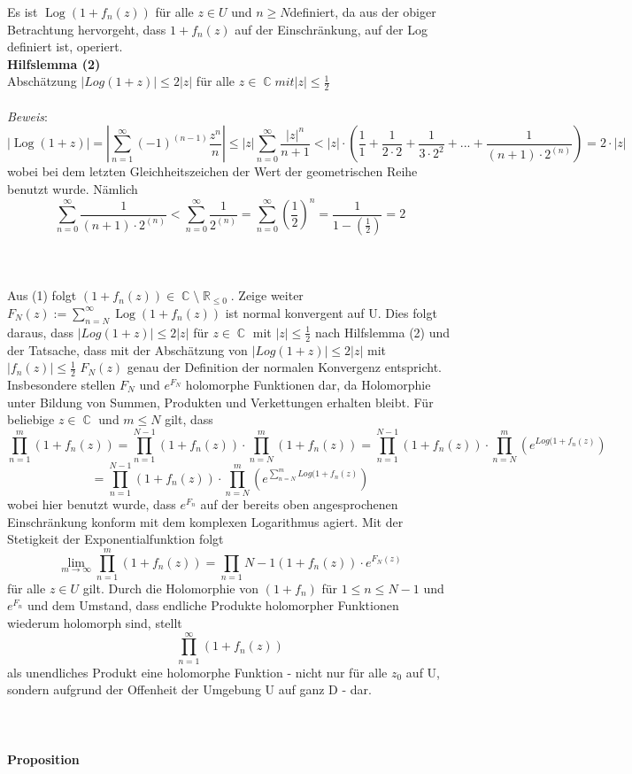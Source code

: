 \documentclass[10pt,a4paper]{article}
\DeclareMathOperator{\R}{\mathbb{R}}
\DeclareMathOperator{\C}{\mathbb{C}}
\DeclareMathOperator{\Log}{Log}
\begin{document}
Es ist $\Log( 1 + f_{n}(z))$ für alle $z \in U $ und $n \geq N$definiert, da aus der obiger Betrachtung hervorgeht, dass $1+f_n(z)$ auf der Einschränkung, auf der Log definiert ist, operiert.
\\
\textbf{Hilfslemma (2)} 
\\
Abschätzung $ |Log(1+z)|\leq 2|z|$ für alle $z \in \C mit |z| \leq \frac{1}{2}$
\\
\\
\textit{Beweis}:
$$|\Log(1+z)|= |\sum_{n = 1}^\infty (-1)^{(n-1)}\frac{z^{n}}{n}|\leq|z|\sum_{n = 0}^\infty\frac{|z|^{n}}{n + 1} < |z|\cdot (\frac{1}{1}+\frac{1}{2\cdot 2}+\frac{1}{3 \cdot2^2}+...+\frac{1}{(n+1)\cdot2^(n)}) = 2\cdot|z| $$wobei bei dem letzten Gleichheitszeichen der Wert der geometrischen Reihe benutzt wurde. Nämlich $$\sum_{n=0}^{\infty}\frac{1}{(n+1)\cdot2^{(n)}} < \sum_{n=0}^{\infty}\frac{1}{2^{(n)}} = \sum_{n=0}^{\infty}(\frac{1}{2})^n = \frac{1}{1-(\frac{1}{2})} = 2 $$
\\
\\
\\
 Aus (1) folgt $(1 + f_{n}(z)) \in \C \setminus \R_{\leq 0 }$. Zeige weiter $F_{N}(z) := \sum_{n = N}^\infty \Log( 1 + f_{n}(z))$ ist normal konvergent auf U. Dies folgt daraus, dass $| Log( 1 + z) | \leq 2|z| $ für $z \in \C$ mit $|z| \leq \frac{1}{2}$ nach Hilfslemma (2) und der Tatsache, dass mit der Abschätzung von $|Log(1+z)| \leq 2|z|$ mit $|f_n(z)|\leq \frac{1}{2}$ $F_{N}(z)$ genau der Definition der normalen Konvergenz entspricht.
Insbesondere stellen $F_{N}$ und $e^{F_{N}}$ holomorphe Funktionen dar, da Holomorphie unter Bildung von Summen, Produkten und Verkettungen erhalten bleibt. Für beliebige $z \in \C $ und $m\leq N$ gilt, dass $$\prod_{n = 1 }^{m}( 1 + f_{n}(z)) = \prod_{n = 1}^{N - 1}( 1 + f_{n}(z))\cdot\prod_{n = N}^{m}( 1 + f_{n}(z))= \prod_{n = 1}^{N - 1}( 1 + f_{n}(z))\cdot\prod_{n = N}^{m}(e^{Log( 1 + f_{n}(z)}) $$ $$= \prod_{n = 1}^{N - 1}( 1 + f_{n}(z))\cdot\prod_{n = N}^{m}(e^{\sum_{n = N}^{m}Log( 1 + f_{n}(z)})$$wobei hier benutzt wurde, dass $e^{F_{n}}$ auf der bereits oben angesprochenen Einschränkung konform mit dem komplexen Logarithmus agiert. Mit der Stetigkeit der Exponentialfunktion folgt $$\lim_{m\rightarrow\infty}\prod_{n=1}^m ( 1 + f_{n}(z)) =\prod_{n = 1}{N - 1}(1 + f_{n}(z))\cdot e^{F_{N}(z)}$$ für alle $z \in U$ gilt. Durch die Holomorphie von $(1+ f_{n})$ für $1 \leq n \leq N - 1$ und $e^{F_{n}}$ und dem Umstand, dass endliche Produkte holomorpher Funktionen wiederum holomorph sind, stellt $$\prod_{n =1}^{\infty}(1 +f_n (z))$$ als unendliches Produkt eine holomorphe Funktion - nicht nur für alle $z_0$ auf U, sondern aufgrund der Offenheit der Umgebung U auf ganz D - dar.
\\
\\
\\
\\
\textbf{Proposition}
\\
\end{document}
